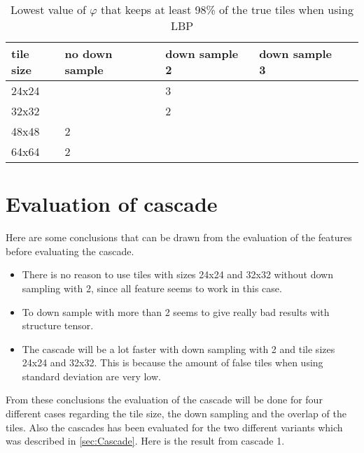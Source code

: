 \begin{table}[H]
\begin{center}
     \begin{tabular}{ | l | l | l | l | l |}
     \hline
     tile size & no down sample & down sample 2 & down sample 3 \\ \hline
   	 24x24 &  & 3 & 		\\ \hline
     32x32 &  & 2 & 			\\ \hline
     48x48 & 2 &     &  		\\ \hline
     64x64 & 2 &     &			\\ \hline
     \end{tabular}
\end{center}
\caption{Lowest value of $\varphi$ that keeps at least 98\% of the true tiles when using LBP}
\end{table}


\section{Evaluation of cascade}
\label{sec:Evalutaion of cascade}
Here are some conclusions that can be drawn from the evaluation of the features before evaluating the cascade.

\begin{itemize}
\item There is no reason to use tiles with sizes 24x24 and 32x32 without down sampling with 2, since all feature seems to work in this case.

\item To down sample with more than 2 seems to give really bad results with structure tensor.

\item The cascade will be a lot faster with down sampling with 2 and tile sizes 24x24 and 32x32. This is because the amount of false tiles when using standard deviation are very low.
\end{itemize}

From these conclusions the evaluation of the cascade will be done for four different cases regarding the tile size, the down sampling and the overlap of the tiles. Also the cascades has been evaluated for the two different variants which was described in \ref{sec:Cascade}. Here is the result from cascade 1.

